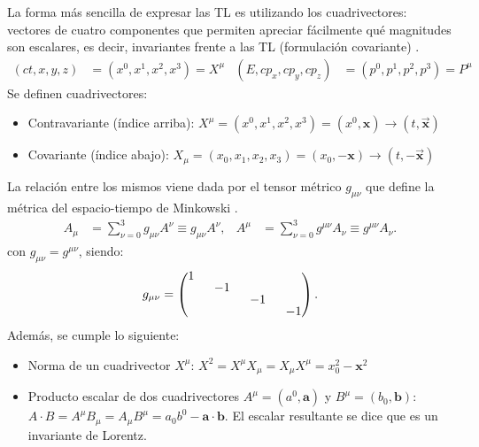 La forma más sencilla de expresar las TL es utilizando los cuadrivectores: vectores de cuatro componentes que permiten apreciar fácilmente qué magnitudes son escalares, es decir, invariantes frente a las TL (formulación covariante) \cite{MCR}.
\begin{align}
(ct,x, y, z) &=(x^0, x^1, x^2, x^3)=X^\mu & (E,cp_x, cp_y, cp_z) &=(p^0, p^1, p^2, p^3)=P^\mu
\end{align}
Se definen cuadrivectores:
\begin{itemize}
\item Contravariante (índice arriba): $X^\mu=(x^0, x^1, x^2, x^3)=(x^0,\textbf{x}) \rightarrow (t,\vec{\boldsymbol{x}})$
\item Covariante (índice abajo): $X_\mu=(x_0, x_1, x_2, x_3)=(x_0,-\textbf{x}) \rightarrow (t,-\vec{\boldsymbol{x}})$
\end{itemize} 
La relación entre los mismos viene dada por el tensor métrico $g_{\mu\nu}$ que define la métrica del espacio-tiempo de Minkowski \cite{MCR}.
\begin{align}
A_{\mu } &=\sum ^{3}_{\nu =0}g_{\mu \nu }A^{\nu} \equiv g_{\mu \nu }A^{\nu}, & A^{\mu } &=\sum ^{3}_{\nu =0}g^{\mu \nu }A_{\nu} \equiv g^{\mu \nu }A_{\nu} . \label{eq:metrica}
\end{align}
\newline
con $g_{\mu\nu} = g^{\mu\nu}$, siendo:
\begin{equation}
g_{\mu\nu} = 
\begingroup 
\renewcommand*{\arraystretch}{0.8}
\setlength\arraycolsep{8pt}
\begin{pmatrix}
1 & & &  \\
& -1 & & \\
& & -1 & \\
& & & -1
\end{pmatrix} .
\endgroup
\end{equation}
Además, se cumple lo siguiente:
\begin{itemize}
\item Norma de un cuadrivector $X^\mu$: $X^{2}=X^{\mu }X_{\mu }=X_{\mu }X^{\mu }=x_{0}^{2}-\boldsymbol{x}^{2}$
\item Producto escalar de dos cuadrivectores $A^{\mu}=\left( a^{0},\boldsymbol{a}\right)$ y $B^{\mu}=\left( b_{0},\boldsymbol{b}\right)$: $A\cdot B=A^{\mu }B_{\mu }=A_{\mu }B^{\mu }=a_{0}b^{0}- \boldsymbol{a}\cdot \boldsymbol{b}$. El escalar resultante se dice que es un invariante de Lorentz.
\end{itemize}

